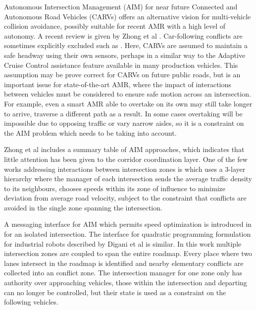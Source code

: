\documentclass[runningheads]{llncs}
\begin{document}
Autonomous Intersection Management (AIM) for near future Connected and Autonomous Road Vehicles (CARVs) offers an alternative vision for multi-vehicle collision avoidance, possibly suitable for recent AMR with a high level of autonomy. A recent review is given by Zhong et al \cite{Zhong2020}. Car-following conflicts are sometimes explicitly excluded such as \cite{Yao2020}. Here, CARVs are assumed to maintain a safe headway using their own sensors, perhaps in a similar way to the Adaptive Cruise Control assistance feature available in many production vehicles. This assumption may be prove correct for CARVs on future public roads, but is an important issue for state-of-the-art AMR, where the impact of interactions between vehicles must be considered to ensure safe motion across an intersection. For example, even a smart AMR able to overtake on its own may still take longer to arrive, traverse a different path as a result. In some cases overtaking will be impossible due to opposing traffic or vary narrow aisles, so it is a constraint on the AIM problem which needs to be taking into account.

Zhong et al \cite{Zhong2020} includes a summary table of AIM approaches, which indicates that little attention has been given to the corridor coordination layer.  One of the few works addressing interactions between intersection zones is \cite{Du2018} which uses a 3-layer hierarchy where the manager of each intersection sends the average traffic density to its neighbours, chooses speeds within its zone of influence to minimize deviation from average road velocity, subject to the constraint that conflicts are avoided in the single zone spanning the intersection. 

A messaging interface for AIM which permits speed  optimization is introduced in \cite{Levin2017} for an isolated intersection. The interface for quadratic programming formulation for industrial robots described by Digani et al \cite{Digani2019} is similar. In this work multiple intersection zones are coupled to span the entire roadmap. Every place where two lanes intersect in the roadmap is identified and nearby elementary conflicts are collected into an conflict zone. The intersection manager for one zone only has authority over approaching vehicles, those within the intersection and departing can no longer be controlled, but their state is used as a constraint on the following vehicles. 
\end{document}
